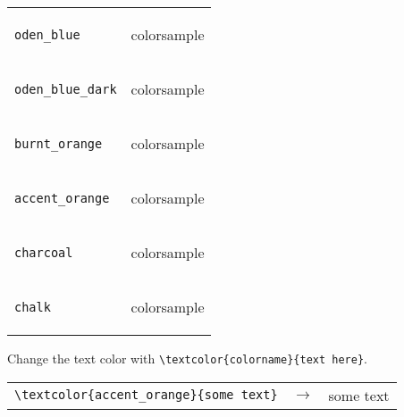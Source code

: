 \documentclass[10pt, aspectratio=169]{oden_beamer}
\begin{document}
\begin{frame}
\begin{center}
\begin{tabular}{lr}
    \texttt{oden\_blue} &
        \setbeamercolor{colorsample}{bg=oden_blue}
        \begin{beamercolorbox}[wd=2cm,ht=.5cm]{colorsample}
        \end{beamercolorbox}
    \\
    \texttt{oden\_blue\_dark} &
        \setbeamercolor{colorsample}{bg=oden_blue_dark}
        \begin{beamercolorbox}[wd=2cm,ht=.5cm]{colorsample}
        \end{beamercolorbox}
    \\
    \texttt{burnt\_orange} &
        \setbeamercolor{colorsample}{bg=burnt_orange}
        \begin{beamercolorbox}[wd=2cm,ht=.5cm]{colorsample}
        \end{beamercolorbox}
    \\
    \texttt{accent\_orange} &
        \setbeamercolor{colorsample}{bg=accent_orange}
        \begin{beamercolorbox}[wd=2cm,ht=.5cm]{colorsample}
        \end{beamercolorbox}
    \\
    \texttt{charcoal} &
        \setbeamercolor{colorsample}{bg=charcoal}
        \begin{beamercolorbox}[wd=2cm,ht=.5cm]{colorsample}
        \end{beamercolorbox}
    \\
    \texttt{chalk} &
        \setbeamercolor{colorsample}{bg=chalk}
        \begin{beamercolorbox}[wd=2cm,ht=.5cm]{colorsample}
        \end{beamercolorbox}
\end{tabular}
\end{center}
Change the text color with \texttt{\textbackslash textcolor\{colorname\}\{text here\}}.
\begin{center}
\begin{tabular}{lcr}
    \texttt{\textbackslash textcolor\{accent\_orange\}\{some text\}}
    & $\longrightarrow$ &
    \textcolor{accent_orange}{some text}
\end{tabular}
\end{center}
\end{frame}
\end{document}
